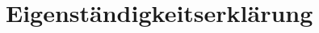 
\printbibliography

\appendix


%
%
%

%
%
%
%

%
%

\clearpage

\thispagestyle{empty}
\section*{Eigenständigkeitserklärung}

